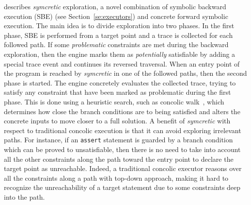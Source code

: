 {%
\cite{DA-ASE14} describes {\em symcretic} exploration, a novel combination of symbolic backward execution (SBE) (see Section~\ref{se:executors}) and concrete forward symbolic execution. The main idea is to divide exploration into two phases. In the first phase, SBE is performed from a target point and a trace is collected for each followed path. If some {\em problematic} constraints are met during the backward exploration, then the engine marks them as {\em potentially} satisfiable by adding a special trace event and continues its reversed traversal. When an entry point of the program is reached by {\em symcretic} in one of the followed paths, then the second phase is started. The engine concretely evaluates the collected trace, trying to satisfy any constraint that have been marked as problematic during the first phase. This is done using a heuristic search, such as concolic walk~\cite{DA-FSE14}, which determines how close the branch conditions are to being satisfied and alters the concrete inputs to move closer to a full solution. A benefit of {\em symcretic} with respect to traditional concolic execution is that it can avoid exploring irrelevant paths. For instance, if an {\tt assert} statement is guarded by a branch condition which can be proved to unsatisfiable, then there is no need to take into account all the other constraints along the path toward the entry point to declare the target point as unreachable. Indeed, a traditional concolic executor reasons over all the constraints along a path with top-down approach, making it hard to recognize the unreachability of a target statement due to some constraints deep into the path.
}



